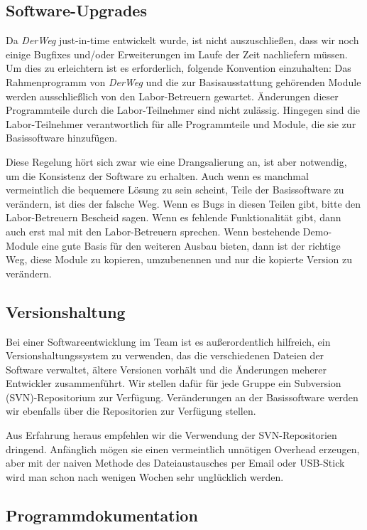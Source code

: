 \documentclass[a4paper, 11pt]{article}
\newcommand{\DerWeg}{\textit{DerWeg }}  %
\begin{document}
{\subsection{Software-Upgrades}

Da \DerWeg just-in-time entwickelt wurde, ist nicht auszuschließen, dass wir noch einige Bugfixes und/oder Erweiterungen im Laufe der Zeit nachliefern müssen. Um dies zu erleichtern ist es erforderlich, folgende Konvention einzuhalten: Das Rahmenprogramm von \DerWeg und die zur Basisausstattung gehörenden Module werden ausschließlich von den Labor-Betreuern gewartet. Änderungen dieser Programmteile durch die Labor-Teilnehmer sind nicht zulässig. Hingegen sind die Labor-Teilnehmer verantwortlich für alle Programmteile und Module, die sie zur Basissoftware hinzufügen.

Diese Regelung hört sich zwar wie eine Drangsalierung an, ist aber notwendig, um die Konsistenz der Software zu erhalten. Auch wenn es manchmal vermeintlich die bequemere Lösung zu sein scheint, Teile der Basissoftware zu verändern, ist dies der falsche Weg. Wenn es Bugs in diesen Teilen gibt, bitte den Labor-Betreuern Bescheid sagen. Wenn es fehlende Funktionalität gibt, dann auch erst mal mit den Labor-Betreuern sprechen. Wenn bestehende Demo-Module eine gute Basis für den weiteren Ausbau bieten, dann ist der richtige Weg, diese Module zu kopieren, umzubenennen und nur die kopierte Version zu verändern.

\subsection{Versionshaltung}

Bei einer Softwareentwicklung im Team ist es außerordentlich hilfreich, ein Versionshaltungssystem zu verwenden, das die verschiedenen Dateien der Software verwaltet, ältere Versionen vorhält und die Änderungen meherer Entwickler zusammenführt. Wir stellen dafür für jede Gruppe ein Subversion (SVN)-Repositorium zur Verfügung. Veränderungen an der Basissoftware werden wir ebenfalls über die Repositorien zur Verfügung stellen.

Aus Erfahrung heraus empfehlen wir die Verwendung der SVN-Repositorien dringend. Anfänglich mögen sie einen vermeintlich unnötigen Overhead erzeugen, aber mit der naiven Methode des Dateiaustausches per Email oder USB-Stick wird man schon nach wenigen Wochen sehr unglücklich werden.

\subsection{Programmdokumentation}

}
\end{document}
